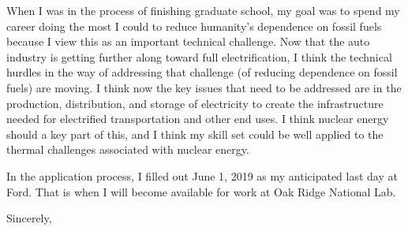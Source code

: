 \documentclass[11pt]{letter} %
\begin{document}
\begin{letter}{}
When I was in the process of finishing graduate school, my goal was to
spend my career doing the most I could to reduce humanity's dependence
on fossil fuels because I view this as an important technical
challenge.  Now that the auto industry is getting further along toward
full electrification, I think the technical hurdles in the way of
addressing that challenge (of reducing dependence on fossil fuels) are
moving.  I think now the key issues that need to be addressed are in
the production, distribution, and storage of electricity to create the
infrastructure needed for electrified transportation and other end
uses.  I think nuclear energy should a key part of this, and I think
my skill set could be well applied to the thermal challenges
associated with nuclear energy.

In the application process, I filled out June 1, 2019 as my
anticipated last day at Ford.  That is when I will become available
for work at Oak Ridge National Lab.

\closing{Sincerely,}




\end{letter}
\end{document}
